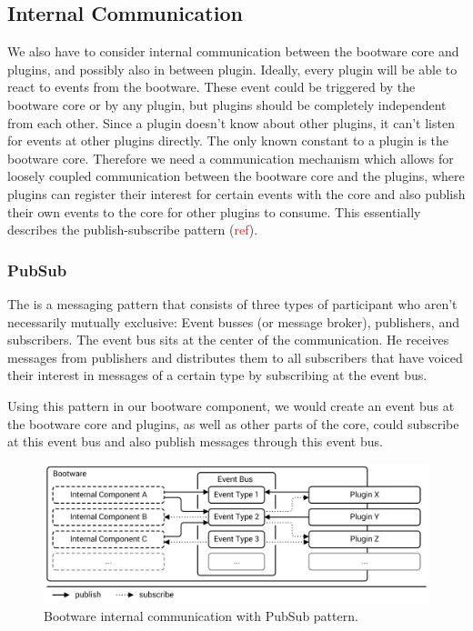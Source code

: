 \subsection{Internal Communication}

We also have to consider internal communication between the bootware core and plugins, and possibly also in between plugin.
Ideally, every plugin will be able to react to events from the bootware.
These event could be triggered by the bootware core or by any plugin, but plugins should be completely independent from each other.
Since a plugin doesn't know about other plugins, it can't listen for events at other plugins directly.
The only known constant to a plugin is the bootware core.
Therefore we need a communication mechanism which allows for loosely coupled communication between the bootware core and the plugins, where plugins can register their interest for certain events with the core and also publish their own events to the core for other plugins to consume.
This essentially describes the publish-subscribe pattern (\textcolor{red}{ref}).

\subsubsection{PubSub}

The  is a messaging pattern that consists of three types of participant who aren't necessarily mutually exclusive: Event busses (or message broker), publishers, and subscribers.
The event bus sits at the center of the communication.
He receives messages from publishers and distributes them to all subscribers that have voiced their interest in messages of a certain type by subscribing at the event bus.

Using this pattern in our bootware component, we would create an event bus at the bootware core and plugins, as well as other parts of the core, could subscribe at this event bus and also publish messages through this event bus.

\begin{figure}[!htbp]
	\centering
	\includegraphics[resolution=600]{design/assets/pubsub}
	\caption{Bootware internal communication with PubSub pattern.}
	\label{image:pubsub}
\end{figure}
